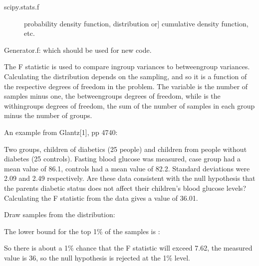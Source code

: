 \documentclass[letterpaper,10pt,english]{sphinxmanual}
\begin{document}
\begin{fulllineitems}
\begin{description}
\end{description}
\begin{description}
\item[{scipy.stats.f}] \leavevmode{[}probability density function, distribution or{]}
cumulative density function, etc.

\end{description}

Generator.f: which should be used for new code.

The F statistic is used to compare in\sphinxhyphen{}group variances to between\sphinxhyphen{}group
variances. Calculating the distribution depends on the sampling, and
so it is a function of the respective degrees of freedom in the
problem.  The variable  is the number of samples minus one, the
between\sphinxhyphen{}groups degrees of freedom, while  is the within\sphinxhyphen{}groups
degrees of freedom, the sum of the number of samples in each group
minus the number of groups.

An example from Glantz{[}1{]}, pp 47\sphinxhyphen{}40:

Two groups, children of diabetics (25 people) and children from people
without diabetes (25 controls). Fasting blood glucose was measured,
case group had a mean value of 86.1, controls had a mean value of
82.2. Standard deviations were 2.09 and 2.49 respectively. Are these
data consistent with the null hypothesis that the parents diabetic
status does not affect their children’s blood glucose levels?
Calculating the F statistic from the data gives a value of 36.01.

Draw samples from the distribution:

\begin{sphinxVerbatim}[commandchars=\\\{\}]
   
   
    
\end{sphinxVerbatim}

The lower bound for the top 1\% of the samples is :

\begin{sphinxVerbatim}[commandchars=\\\{\}]
\PYG{p}{[}\PYG{p}{]}
\end{sphinxVerbatim}

So there is about a 1\% chance that the F statistic will exceed 7.62,
the measured value is 36, so the null hypothesis is rejected at the 1\%
level.

\end{fulllineitems}
\end{document}
